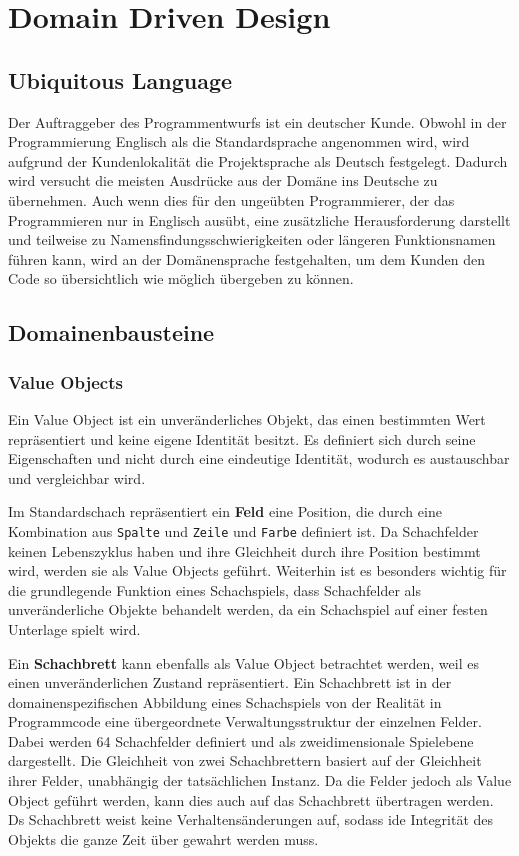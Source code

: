 \chapter{Domain Driven Design}

\section{Ubiquitous Language}

Der Auftraggeber des Programmentwurfs ist ein deutscher Kunde. 
Obwohl in der Programmierung Englisch als die Standardsprache angenommen wird, wird aufgrund der Kundenlokalität die Projektsprache als \glqq Deutsch\grqq{} festgelegt. 
Dadurch wird versucht die meisten Ausdrücke aus der Domäne ins Deutsche zu übernehmen. 
Auch wenn dies für den ungeübten Programmierer, der das Programmieren nur in Englisch ausübt, eine zusätzliche Herausforderung darstellt und teilweise zu Namensfindungsschwierigkeiten oder längeren Funktionsnamen führen kann, wird an der Domänensprache festgehalten, um dem Kunden den Code so übersichtlich wie möglich übergeben zu können.

\section{Domainenbausteine}

\subsection*{Value Objects}

Ein Value Object ist ein unveränderliches Objekt, das einen bestimmten Wert repräsentiert und keine eigene Identität besitzt. 
Es definiert sich durch seine Eigenschaften und nicht durch eine eindeutige Identität, wodurch es austauschbar und vergleichbar wird.

Im Standardschach repräsentiert ein \textbf{Feld} eine Position, die durch eine Kombination aus \texttt{Spalte} und \texttt{Zeile} und \texttt{Farbe} definiert ist. 
Da Schachfelder keinen Lebenszyklus haben und ihre Gleichheit durch ihre Position bestimmt wird, werden sie als Value Objects geführt. 
Weiterhin ist es besonders wichtig für die grundlegende Funktion eines Schachspiels, dass Schachfelder als unveränderliche Objekte behandelt werden, da ein Schachspiel auf einer \glqq festen Unterlage\grqq{} spielt wird. 

Ein \textbf{Schachbrett} kann ebenfalls als Value Object betrachtet werden, weil es einen unveränderlichen Zustand repräsentiert. 
Ein Schachbrett ist in der domainenspezifischen Abbildung eines Schachspiels von der Realität in Programmcode eine übergeordnete Verwaltungsstruktur der einzelnen Felder.
Dabei werden 64 Schachfelder definiert und als zweidimensionale Spielebene dargestellt.
Die Gleichheit von zwei Schachbrettern basiert auf der Gleichheit ihrer Felder, unabhängig der tatsächlichen Instanz. 
Da die Felder jedoch als Value Object geführt werden, kann dies auch auf das Schachbrett übertragen werden. 
Ds Schachbrett weist keine Verhaltensänderungen auf, sodass ide Integrität des Objekts die ganze Zeit über gewahrt werden muss. 


